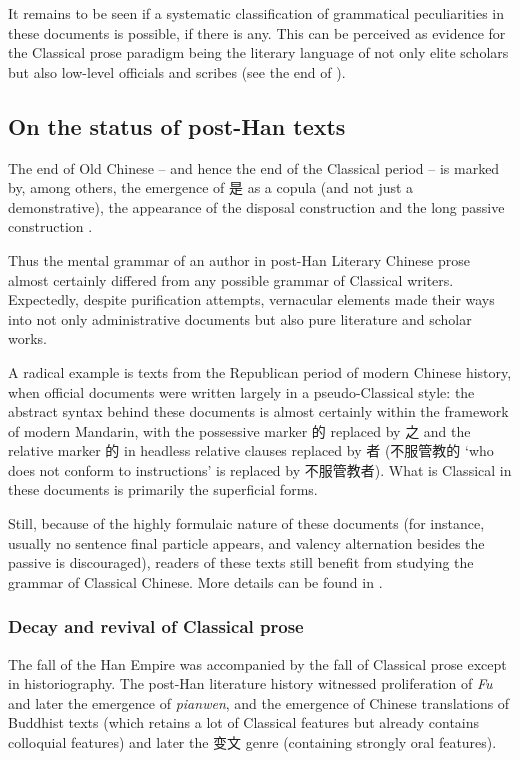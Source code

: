 \documentclass[UTF8, a4paper, oneside, scheme=plain, 12pt]{ctexrep}
\newcommand*{\citepage}[1]{p.~{#1}}
\newcommand{\work}[1]{\textit{#1}}
\newcommand{\translate}[1]{`#1'}
\begin{document}
It remains to be seen if a systematic classification of grammatical peculiarities in these documents is possible, if there is any.
This can be perceived as evidence for the Classical prose paradigm being the literary language of not only elite scholars but also low-level officials and scribes (see the end of ).

\subsection{On the status of post-Han texts}\label{sec:introduction.history.post-han}

The end of Old Chinese -- and hence the end of the Classical period --
is marked by, among others, 
the emergence of 是 as a copula (and not just a demonstrative),
the appearance of the disposal construction 
and the long passive construction  \citep[\citepage{35}]{wang2013history}.

Thus the mental grammar of an author in post-Han Literary Chinese prose almost certainly differed from any possible grammar of Classical writers.
Expectedly, despite purification attempts,
vernacular elements made their ways into not only administrative documents
but also pure literature and scholar works.

A radical example is texts from the Republican period of modern Chinese history, 
when official documents were written largely in a pseudo-Classical style:
the abstract syntax behind these documents is almost certainly within the framework of modern Mandarin,
with the possessive marker 的 replaced by 之
and the relative marker 的 in headless relative clauses replaced by 者 (不服管教的 \translate{who does not conform to instructions} is replaced by 不服管教者).
What is Classical in these documents is primarily the superficial forms.

Still, because of the highly formulaic nature of these documents (for instance, usually no sentence final particle appears, and valency alternation besides the passive is discouraged),
readers of these texts still benefit from studying the grammar of Classical Chinese.
More details can be found in .

\subsubsection{Decay and revival of Classical prose}

The fall of the Han Empire was accompanied by the fall of Classical prose except in historiography.
The post-Han literature history witnessed proliferation of \work{Fu} and later the emergence of \work{pianwen},
and the emergence of Chinese translations of Buddhist texts (which retains a lot of Classical features but already contains colloquial features) and later the 变文 genre (containing strongly oral features).
\end{document}
